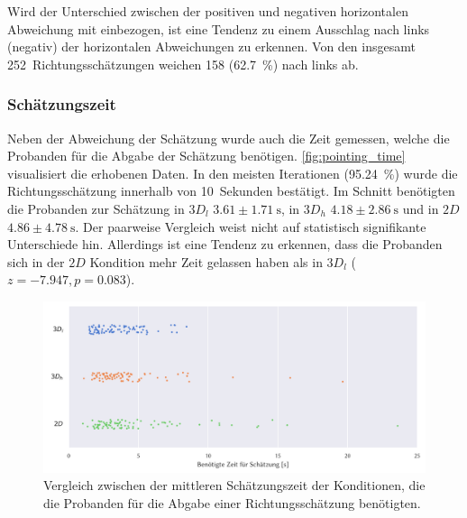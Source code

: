 Wird der Unterschied zwischen der positiven und negativen horizontalen Abweichung mit einbezogen, ist eine Tendenz zu einem Ausschlag nach links (negativ) der horizontalen Abweichungen zu erkennen.
Von den insgesamt 252~Richtungsschätzungen weichen 158 (\SI{62,7}{\percent}) nach links ab.

\subsubsection*{Schätzungszeit}
Neben der Abweichung der Schätzung wurde auch die Zeit gemessen, welche die Probanden für die Abgabe der Schätzung benötigen.
\autoref{fig:pointing_time} visualisiert die erhobenen Daten.
In den meisten Iterationen (\SI{95,24}{\percent}) wurde die Richtungsschätzung innerhalb von 10~Sekunden bestätigt.
Im Schnitt benötigten die Probanden zur Schätzung in $3D_l$ $\num{3,61} \pm \SI{1,71}{\second}$, in $3D_h$ \mbox{$\num{4,18} \pm \SI{2,86}{\second}$} und in $2D$ $\num{4,86} \pm \SI{4,78}{\second}$.
Der paarweise Vergleich weist nicht auf statistisch signifikante Unterschiede hin.
Allerdings ist eine Tendenz zu erkennen, dass die Probanden sich in der $2D$ Kondition mehr Zeit gelassen haben als in $3D_l$ ($z = -7.947,	p = 0.083$).
\begin{figure}[h]
    \centering
    \includegraphics[width=\linewidth]{figures/analysis/pointing_time}
    \caption{Vergleich zwischen der mittleren Schätzungszeit der Konditionen, die die Probanden für die Abgabe einer Richtungsschätzung benötigten.}
    \label{fig:pointing_time}
\end{figure}

